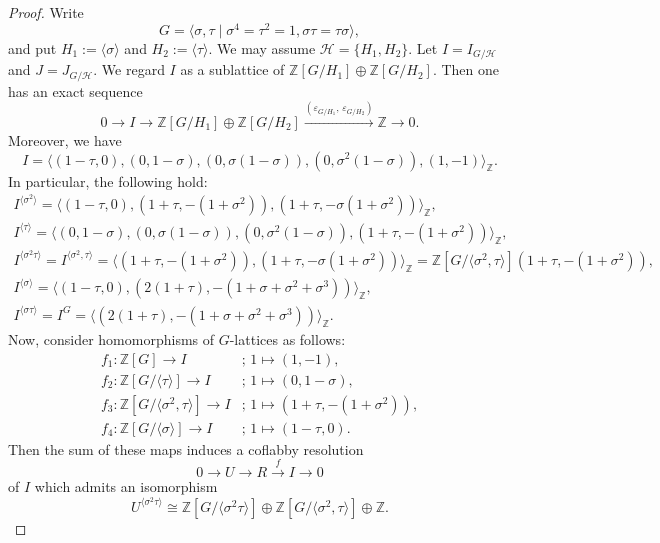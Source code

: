 \documentclass[12pt]{amsart}
\theoremstyle{plain}
\theoremstyle{definition}
\numberwithin{thm}{section}
\numberwithin{equation}{section}
\newcommand{\Z}{\mathbb{Z}}
\newcommand{\cH}{\mathcal{H}}
\begin{document}
\begin{proof}
Write
\begin{equation*}
    G=\langle \sigma,\tau\mid \sigma^{4}=\tau^{2}=1,\sigma\tau=\tau\sigma\rangle, 
\end{equation*}
and put $H_{1}:=\langle \sigma\rangle$ and $H_{2}:=\langle \tau \rangle$. We may assume $\cH=\{H_{1},H_{2}\}$. Let $I=I_{G/\cH}$ and $J=J_{G/\cH}$. We regard $I$ as a sublattice of $\Z[G/H_{1}] \oplus \Z[G/H_{2}]$. Then one has an exact sequence
\begin{equation}\label{eq:42mn}
    0\rightarrow I \rightarrow \Z[G/H_{1}]\oplus \Z[G/H_{2}] \xrightarrow{(\varepsilon_{G/H_{1}},\,\varepsilon_{G/H_{2}})} \Z \rightarrow 0. 
\end{equation}
Moreover, we have
\begin{equation*}
    I=\langle (1-\tau,0),(0,1-\sigma),(0,\sigma(1-\sigma)),(0,\sigma^{2}(1-\sigma)),(1,-1) \rangle_{\Z}. 
\end{equation*}
In particular, the following hold: 
\begin{gather*}
    I^{\langle \sigma^{2} \rangle}=\langle (1-\tau,0), (1+\tau,-(1+\sigma^{2})),(1+\tau,-\sigma(1+\sigma^{2}))\rangle_{\Z},\\
    I^{\langle \tau\rangle}=\langle (0,1-\sigma),(0,\sigma(1-\sigma)),(0,\sigma^{2}(1-\sigma)),(1+\tau,-(1+\sigma^{2}))\rangle_{\Z},\\
    I^{\langle \sigma^{2}\tau \rangle}=I^{\langle \sigma^{2},\tau \rangle}=\langle (1+\tau,-(1+\sigma^{2})),(1+\tau,-\sigma(1+\sigma^{2}))\rangle_{\Z}=\Z[G/\langle \sigma^{2},\tau \rangle](1+\tau,-(1+\sigma^{2})),\\
    I^{\langle \sigma \rangle}=\langle (1-\tau,0),(2(1+\tau),-(1+\sigma+\sigma^{2}+\sigma^{3})) \rangle_{\Z},\\
    I^{\langle \sigma\tau\rangle}=I^{G}=\langle (2(1+\tau),-(1+\sigma+\sigma^{2}+\sigma^{3}))\rangle_{\Z}.
\end{gather*}
Now, consider homomorphisms of $G$-lattices as follows: 
\begin{align*}
f_{1}\colon \Z[G]\rightarrow I&;\,1\mapsto (1,-1),\\
f_{2}\colon \Z[G/\langle \tau \rangle]\rightarrow I&;\,1\mapsto (0,1-\sigma),\\
f_{3}\colon \Z[G/\langle \sigma^{2},\tau \rangle]\rightarrow I&;\,1\mapsto (1+\tau,-(1+\sigma^{2})),\\
f_{4}\colon \Z[G/\langle \sigma \rangle]\rightarrow I&;\,1\mapsto  (1-\tau,0). 
\end{align*}
Then the sum of these maps induces a coflabby resolution
\begin{equation*}
0\rightarrow U \rightarrow R \xrightarrow{f} I \rightarrow 0
\end{equation*}
of $I$ which admits an isomorphism
\begin{equation}\label{eq:stfx}
U^{\langle \sigma^{2}\tau \rangle}\cong \Z[G/\langle \sigma^{2}\tau \rangle]\oplus \Z[G/\langle \sigma^{2},\tau \rangle]\oplus \Z. 
\end{equation}


\end{proof}
\end{document}
